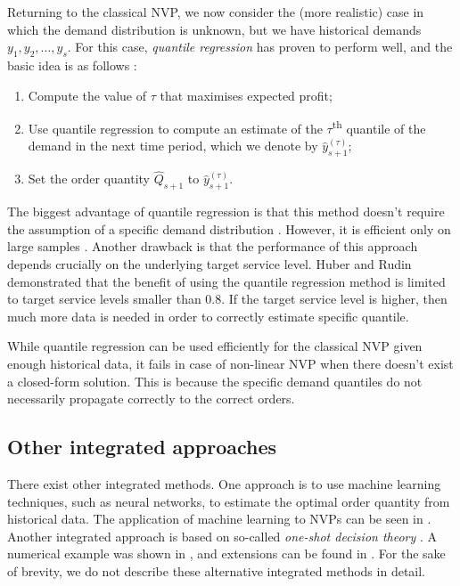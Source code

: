 \documentclass{article}
\begin{document}
Returning to the classical NVP, we now consider the (more realistic) case in which the demand distribution is unknown, but we have historical demands $y_1,y_2,\dots,y_s$.
For this case, \emph{quantile regression}
has proven to perform well, and the basic idea is as follows \cite{BT06,Br16,CS19,HNS15,Hu19}:
\begin{enumerate}
\item Compute the value of $\tau$ that maximises expected profit;
\item Use quantile regression to compute an estimate of the $\tau$\textsuperscript{th} quantile of the demand in the next time period, which we denote by $\hat{y}_{s+1}^{(\tau)}$;
\item Set the order quantity $\hat{Q}_{s+1}$ to $\hat{y}_{s+1}^{(\tau)}$.
\end{enumerate}

The biggest advantage of quantile regression is that this method doesn't require the assumption of a specific demand distribution \cite{Hu19}. However, it is efficient only on large samples \cite{Hu19,RV19}. Another drawback is that the performance of this approach depends crucially on the underlying target service level. Huber \cite{Hu19} and Rudin \cite{RV19} demonstrated that the benefit of using the quantile regression method is limited to target service levels smaller than 0.8. If the target service level is higher, then much more data is needed in order to correctly estimate specific quantile.

While quantile regression can be used efficiently for the classical NVP given enough historical data, it fails in case of non-linear NVP when there doesn't exist a closed-form solution. This is because the specific demand quantiles do not necessarily propagate correctly to the correct orders.

\subsection{Other integrated approaches} %

There exist other integrated methods. One approach is to use machine learning techniques, such as neural networks, to estimate the optimal order quantity from historical data. The application of machine learning to NVPs can be seen in \cite{CS19,OST20,RV19}. Another integrated approach is based on so-called \emph{one-shot decision theory} \cite{Guo11,GM14,Ma19}. A numerical example was shown in \cite{Guo11}, and extensions can be found in \cite{Ma19}. For the sake of brevity, we do not describe these alternative integrated methods in detail.
\end{document}
